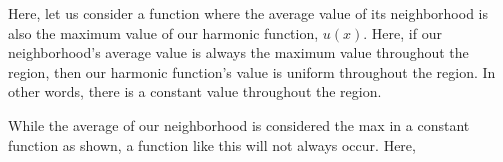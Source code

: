 Here, let us consider a function where the average value of its neighborhood
is also the maximum value of our harmonic function, $u(x)$. Here, if our
neighborhood's average value is always the maximum value throughout the
region, then our harmonic function's value is uniform throughout the region.
In other words, there is a constant value throughout the region.

\begin{center}
\end{center}

While the average of our neighborhood is considered the max in a constant function as shown, a function like this will not always occur.
Here,
